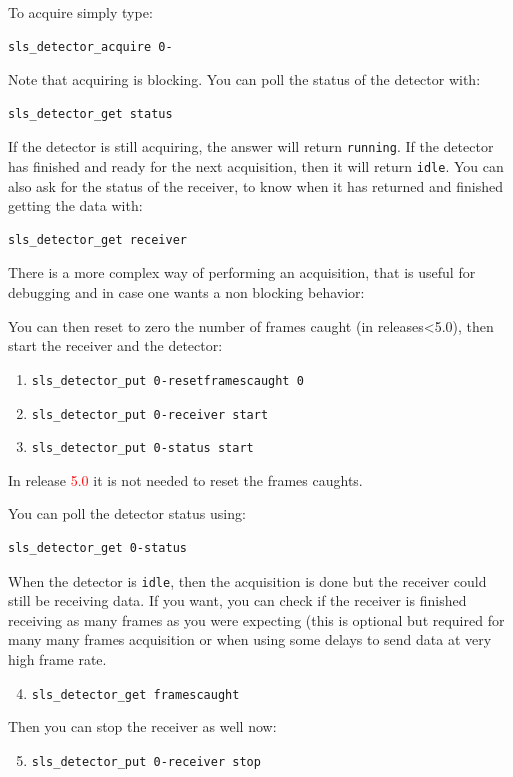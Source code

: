 \documentclass{article}
\begin{document}
To acquire simply type:
\begin{verbatim}
sls_detector_acquire 0-
\end{verbatim}
Note that acquiring is blocking.
You can poll the status of the detector with:
\begin{verbatim}
sls_detector_get status
\end{verbatim}
If the detector is still acquiring, the answer will return {\tt{running}}. If the detector has finished and ready for the next acquisition, then it will return {\tt{idle}}.
You can also ask for the status of the receiver, to know when it has returned and finished getting the data with:
\begin{verbatim}
sls_detector_get receiver
\end{verbatim}

There is a more complex way of performing an acquisition, that is useful for debugging and in case one wants a non blocking behavior: 

You can then reset to zero the number of frames caught (in releases<5.0), then  start the receiver and the detector:
\begin{enumerate}
\item {\tt{sls\_detector\_put 0-resetframescaught 0}} 
\item {\tt{sls\_detector\_put 0-receiver start}} 
\item {\tt{sls\_detector\_put 0-status start}} 
\end{enumerate}
In release \textcolor{red}{5.0} it is not needed to reset the frames caughts.

You can poll the detector status using:
\begin{verbatim}
sls_detector_get 0-status 
\end{verbatim}
When the detector is {\tt{idle}}, then the acquisition is done but the receiver could still be receiving data. If you want, you can check if the receiver is finished receiving as many frames as you were expecting (this is optional but required for many many frames acquisition or when using some delays to send data at very high frame rate.
\begin{enumerate}
\setcounter{enumi}{3}
\item {\tt{sls\_detector\_get framescaught}} 
\end{enumerate}
Then you can stop the receiver as well now:
\begin{enumerate}
\setcounter{enumi}{4}
\item {\tt{sls\_detector\_put 0-receiver stop}} 
\end{enumerate}
\end{document}

